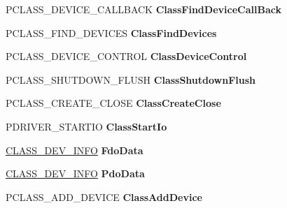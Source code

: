 \begin{DoxyCompactItemize}
P\+C\+L\+A\+S\+S\+\_\+\+D\+E\+V\+I\+C\+E\+\_\+\+C\+A\+L\+L\+B\+A\+CK {\bfseries Class\+Find\+Device\+Call\+Back}
\item 
\mbox{\label{struct___c_l_a_s_s___i_n_i_t___d_a_t_a_a8213a150f6a79ba4baaa62d1cad5ed9d}} 
P\+C\+L\+A\+S\+S\+\_\+\+F\+I\+N\+D\+\_\+\+D\+E\+V\+I\+C\+ES {\bfseries Class\+Find\+Devices}
\item 
\mbox{\label{struct___c_l_a_s_s___i_n_i_t___d_a_t_a_acacd9697f4280032a9cf9cd5067a55c1}} 
P\+C\+L\+A\+S\+S\+\_\+\+D\+E\+V\+I\+C\+E\+\_\+\+C\+O\+N\+T\+R\+OL {\bfseries Class\+Device\+Control}
\item 
\mbox{\label{struct___c_l_a_s_s___i_n_i_t___d_a_t_a_ab694cc6f065703e8296bac4b686cdc01}} 
P\+C\+L\+A\+S\+S\+\_\+\+S\+H\+U\+T\+D\+O\+W\+N\+\_\+\+F\+L\+U\+SH {\bfseries Class\+Shutdown\+Flush}
\item 
\mbox{\label{struct___c_l_a_s_s___i_n_i_t___d_a_t_a_a7c3cc75f0282424bb18f61ab643092fc}} 
P\+C\+L\+A\+S\+S\+\_\+\+C\+R\+E\+A\+T\+E\+\_\+\+C\+L\+O\+SE {\bfseries Class\+Create\+Close}
\item 
\mbox{\label{struct___c_l_a_s_s___i_n_i_t___d_a_t_a_a37b9938b05dd28e578bd651fdc6eaf9e}} 
P\+D\+R\+I\+V\+E\+R\+\_\+\+S\+T\+A\+R\+T\+IO {\bfseries Class\+Start\+Io}
\item 
\mbox{\label{struct___c_l_a_s_s___i_n_i_t___d_a_t_a_a4e59313a1a636566d7ad829fdd530631}} 
\hyperlink{struct___c_l_a_s_s___d_e_v___i_n_f_o}{C\+L\+A\+S\+S\+\_\+\+D\+E\+V\+\_\+\+I\+N\+FO} {\bfseries Fdo\+Data}
\item 
\mbox{\label{struct___c_l_a_s_s___i_n_i_t___d_a_t_a_a9a51a44b094554cd48761fa789a07700}} 
\hyperlink{struct___c_l_a_s_s___d_e_v___i_n_f_o}{C\+L\+A\+S\+S\+\_\+\+D\+E\+V\+\_\+\+I\+N\+FO} {\bfseries Pdo\+Data}
\item 
\mbox{\label{struct___c_l_a_s_s___i_n_i_t___d_a_t_a_ac6bb6065d883f8de3548afdbbd0a2384}} 
P\+C\+L\+A\+S\+S\+\_\+\+A\+D\+D\+\_\+\+D\+E\+V\+I\+CE {\bfseries Class\+Add\+Device}

\end{DoxyCompactItemize}
